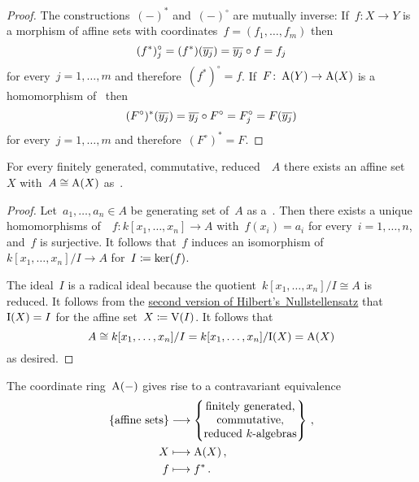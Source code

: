 \begin{proof}
  The constructions~$(-)^*$ and~$(-)^\circ$ are mutually inverse:
  If~$f \colon X \to Y$ is a morphism of affine sets with coordinates~$f = (f_1, \dotsc, f_m)$ then
  \[
      (f^*)^\circ_j
    = (f^*)(\overline{y_j})
    = \overline{y_j} \circ f
    = f_j
  \]
  for every~$j = 1, \dotsc, m$ and therefore~$(f^*)^\circ = f$.
  If~$F \colon \operatorname{A}(Y) \to \operatorname{A}(X)$ is a homomorphism of~ then
  \[
      (F^\circ)^*(\overline{y_j})
    = \overline{y_j} \circ F^\circ
    = F^\circ_j
    = F(\overline{y_j})
  \]
  for every~$j = 1, \dotsc, m$ and therefore~$(F^\circ)^* = F$.
\end{proof}


\begin{lemma}
  \label{coordinate ring is dense}
  For every finitely generated, commutative, reduced~~$A$ there exists an affine set~$X$ with~$A \cong \operatorname{A}(X)$ as~.
\end{lemma}


\begin{proof}
  Let~$a_1, \dotsc, a_n \in A$ be generating set of~$A$ as a~.
  Then there exists a unique homomorphisms of~~$f \colon k[x_1, \dotsc, x_n] \to A$ with~$f(x_i) = a_i$ for every~$i = 1, \dotsc, n$, and~$f$ is surjective.
  It follows that~$f$ induces an isomorphism of~~$k[x_1, \dotsc, x_n]/I \to A$ for~$I \coloneqq \ker(f)$.
  
  The ideal~$I$ is a radical ideal because the quotient~$k[x_1, \dotsc, x_n]/I \cong A$ is reduced.
  It follows from the \hyperref[nullstellensatz 3]{second version of Hilbert’s~Nullstellensatz} that~$\operatorname{I}(X) = I$ for the affine set~$X \coloneqq \operatorname{V}(I)$.
  It follows that
  \[
          A
    \cong k[x_1, \dots, x_n]/I
    =     k[x_1, \dots, x_n]/{\operatorname{I}(X)}
    =     \operatorname{A}(X)
  \]
  as desired.
\end{proof}


\begin{corollary}
  The coordinate ring~$\operatorname{A}(-)$ gives rise to a contravariant equivalence
  \begin{align*}
    \{
      \text{affine sets}
    \}
    &\longto
    \left\{
      \begin{tabular}{@{}c@{}}
        finitely generated, \\
        commutative,        \\
        reduced~\dash{$k$}{algebras}
      \end{tabular}
    \right\} \,,
    \\
    X
    &\longmapsto
    \coord(X) \,,
    \\
    f
    &\longmapsto
    f^* \,.
  \end{align*}
\end{corollary}


